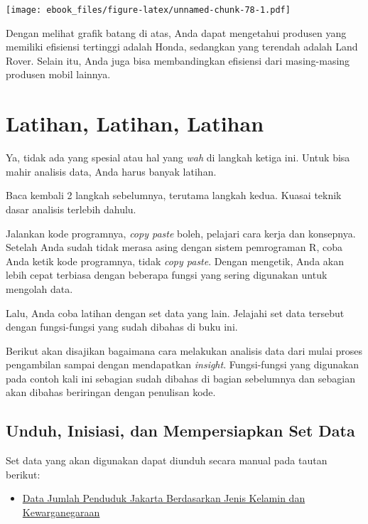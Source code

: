 \documentclass[openany]{book}
\providecommand{\tightlist}{%
  \setlength{\itemsep}{0pt}\setlength{\parskip}{0pt}}
\begin{document}
\texttt{[image: ebook\_files/figure-latex/unnamed-chunk-78-1.pdf]}

Dengan melihat grafik batang di atas, Anda dapat mengetahui produsen
yang memiliki efisiensi tertinggi adalah Honda, sedangkan yang terendah
adalah Land Rover. Selain itu, Anda juga bisa membandingkan efisiensi
dari masing-masing produsen mobil lainnya.

\chapter{Latihan, Latihan, Latihan}\label{latihan-latihan-latihan}

Ya, tidak ada yang spesial atau hal yang \emph{wah} di langkah ketiga
ini. Untuk bisa mahir analisis data, Anda harus banyak latihan.

Baca kembali 2 langkah sebelumnya, terutama langkah kedua. Kuasai teknik
dasar analisis terlebih dahulu.

Jalankan kode programnya, \emph{copy paste} boleh, pelajari cara kerja
dan konsepnya. Setelah Anda sudah tidak merasa asing dengan sistem
pemrograman R, coba Anda ketik kode programnya, tidak \emph{copy paste}.
Dengan mengetik, Anda akan lebih cepat terbiasa dengan beberapa fungsi
yang sering digunakan untuk mengolah data.

Lalu, Anda coba latihan dengan set data yang lain. Jelajahi set data
tersebut dengan fungsi-fungsi yang sudah dibahas di buku ini.

Berikut akan disajikan bagaimana cara melakukan analisis data dari mulai
proses pengambilan sampai dengan mendapatkan \emph{insight}.
Fungsi-fungsi yang digunakan pada contoh kali ini sebagian sudah dibahas
di bagian sebelumnya dan sebagian akan dibahas beriringan dengan
penulisan kode.

\section{Unduh, Inisiasi, dan Mempersiapkan Set
Data}\label{unduh-inisiasi-dan-mempersiapkan-set-data}

Set data yang akan digunakan dapat diunduh secara manual pada tautan
berikut:

\begin{itemize}
\tightlist
\item
  \href{http://data.jakarta.go.id/dataset/jumlahpendudukberdasarkanjeniskelamindankewarganegaraandkijakarta/resource/5a948e1c-facd-4eec-8943-bef5c45d16d8}{Data
  Jumlah Penduduk Jakarta Berdasarkan Jenis Kelamin dan Kewarganegaraan}
\end{itemize}
\end{document}
